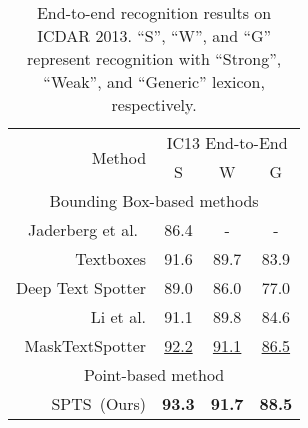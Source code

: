 \documentclass[sigconf]{acmart}
\newcommand{\methodName}{SPTS}
\begin{document}
\begin{table}[t!]
    \centering
    \caption{End-to-end recognition results on ICDAR 2013. ``S'', ``W'', and ``G'' represent recognition with “Strong”, “Weak”, and “Generic” lexicon, respectively.}
    \label{ICDAR 2013 End-to-End recognition result}
    \footnotesize
    \begin{tabular}{r|c|c|c}
    \hline
    \multirow{2}{*}{Method} & \multicolumn{3}{c}{IC13 End-to-End} \\ \cline{2-4} 
                            & \multicolumn{1}{c|}{S}    & \multicolumn{1}{c|}{W}    & G    \\ \hline
    \multicolumn{4}{c}{Bounding Box-based methods} \\ \hline                        
    Jaderberg et al.\  \cite{jaderberg2016reading} & 86.4 & - & -\\ 
    Textboxes \cite{liao2017textboxes} & 91.6 & 89.7 & 83.9\\ 
    Deep Text Spotter \cite{busta2017deep} & 89.0 & 86.0 & 77.0\\ 
    Li et al. \cite{li2017towards} & 91.1 & 89.8 & 84.6 \\ 
    MaskTextSpotter \cite{lyu2018mask} & \underline{92.2} & \underline{91.1} & \underline{86.5} \\ 
    \hline 
\multicolumn{4}{c}{Point-based method} \\ \hline
    \methodName\ (Ours) & \textbf{93.3} & \textbf{91.7} & \textbf{88.5} \\ \hline
    \end{tabular}
\end{table}
    
\end{document}
